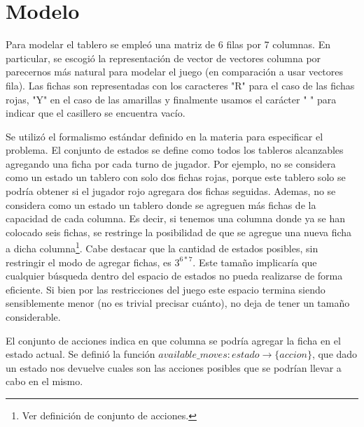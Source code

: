 \documentclass[10pt,a4paper]{article}
\begin{document}

\fecha{\today}

\grupo{}



\maketitle

\newpage
\section{Modelo}
Para modelar el tablero se empleó una matriz de 6 filas por 7 columnas. En particular, se escogió la representación de vector de vectores columna por parecernos más natural para modelar el juego (en comparación a usar vectores fila).
Las fichas son representadas con los caracteres "R" para el caso de las fichas rojas, "Y" en el caso de las amarillas y finalmente usamos el carácter " " para indicar que el casillero se encuentra vacío.

Se utilizó el formalismo estándar definido en la materia para especificar el problema. El conjunto de estados se define como todos los tableros alcanzables agregando una ficha por cada turno de jugador. Por ejemplo, no se considera como un estado un tablero con solo dos fichas rojas, porque este tablero solo se podría obtener si el jugador rojo agregara dos fichas seguidas. Ademas, no se considera como un estado un tablero donde se agreguen más fichas de la capacidad de cada columna. Es decir, si tenemos una columna donde ya se han colocado seis fichas, se restringe la posibilidad de que se agregue una nueva ficha a dicha columna\footnote{Ver definición de conjunto de acciones.}. Cabe destacar que la cantidad de estados posibles, sin restringir el modo de agregar fichas, es $3^{6*7}$. Este tamaño implicaría que cualquier búsqueda dentro del espacio de estados no pueda realizarse de forma eficiente. Si bien por las restricciones del juego este espacio termina siendo sensiblemente menor (no es trivial precisar cuánto), no deja de tener un tamaño considerable.

El conjunto de acciones indica en que columna se podría agregar la ficha en el estado actual. Se definió la función $available\_moves:estado \rightarrow \{accion\}$, que dado un estado nos devuelve cuales son las acciones posibles que se podrían llevar a cabo en el mismo.
\end{document}

